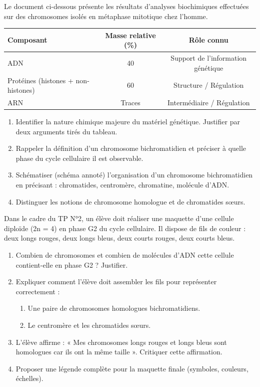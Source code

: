 \documentclass[11pt]{article}
\begin{document}
\begin{exercice}
Le document ci-dessous présente les résultats d'analyses biochimiques effectuées sur des chromosomes isolés en métaphase mitotique chez l'homme.

\begin{center}
\begin{tabular}{|l|c|c|}
\hline
\textbf{Composant} & \textbf{Masse relative (\%)} & \textbf{Rôle connu} \\
\hline
ADN & 40 & Support de l'information génétique \\
\hline
Protéines (histones + non-histones) & 60 & Structure / Régulation \\
\hline
ARN & Traces & Intermédiaire / Régulation \\
\hline
\end{tabular}
\end{center}

\begin{enumerate}
\item Identifier la nature chimique majeure du matériel génétique. Justifier par deux arguments tirés du tableau.
\item Rappeler la définition d'un chromosome bichromatidien et préciser à quelle phase du cycle cellulaire il est observable.
\item Schématiser (schéma annoté) l'organisation d'un chromosome bichromatidien en précisant : chromatides, centromère, chromatine, molécule d'ADN.
\item Distinguer les notions de chromosome homologue et de chromatides sœurs.
\end{enumerate}
\end{exercice}

\begin{exercice}
Dans le cadre du TP N°2, un élève doit réaliser une maquette d'une cellule diploïde (2n = 4) en phase G2 du cycle cellulaire. Il dispose de fils de couleur : deux longs rouges, deux longs bleus, deux courts rouges, deux courts bleus.

\begin{enumerate}
\item Combien de chromosomes et combien de molécules d'ADN cette cellule contient-elle en phase G2 ? Justifier.
\item Expliquer comment l'élève doit assembler les fils pour représenter correctement :
\begin{enumerate}
\item Une paire de chromosomes homologues bichromatidiens.
\item Le centromère et les chromatides sœurs.
\end{enumerate}
\item L'élève affirme : « Mes chromosomes longs rouges et longs bleus sont homologues car ils ont la même taille ». Critiquer cette affirmation.
\item Proposer une légende complète pour la maquette finale (symboles, couleurs, échelles).
\end{enumerate}
\end{exercice}
\end{document}
